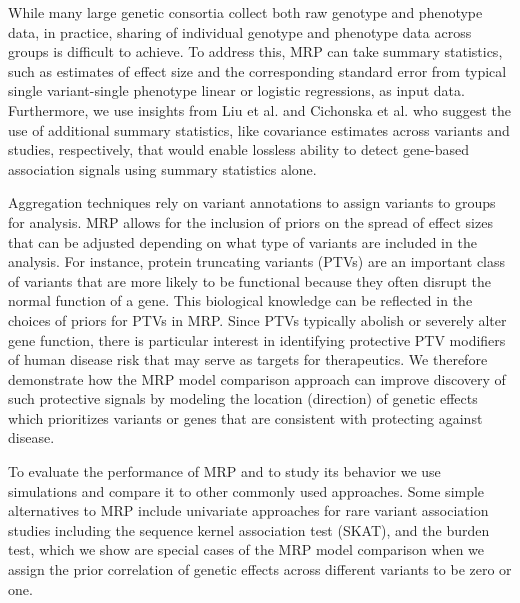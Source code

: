 While many large genetic consortia collect both raw genotype and phenotype data, in practice, sharing of individual genotype and phenotype data across groups is difficult to achieve. To address this, MRP can take summary statistics, such as estimates of effect size and the corresponding standard error from typical single variant-single phenotype linear or logistic regressions, as input data. Furthermore, we use insights from Liu et al.\cite{liu2014meta} and Cichonska et al.\cite{cichonska2016metacca} who suggest the use of additional summary statistics, like covariance estimates across variants and studies, respectively, that would enable lossless ability to detect gene-based association signals using summary statistics alone.  

Aggregation techniques rely on variant annotations to assign variants to groups for analysis. MRP allows for the inclusion of priors on the spread of effect sizes that can be adjusted depending on what type of variants are included in the analysis. For instance, protein truncating variants (PTVs)\cite{rivas2013assessing,rivas2015effect} are an important class of variants that are more likely to be functional because they often disrupt the normal function of a gene. This biological knowledge can be reflected in the choices of priors for PTVs in MRP. Since PTVs typically abolish or severely alter gene function, there is particular interest in identifying protective PTV modifiers of human disease risk that may serve as targets for therapeutics\cite{pcsk9,cohen2006sequence,sullivan2012effect}. We therefore demonstrate how the MRP model comparison approach can improve discovery of such protective signals by modeling the location (direction) of genetic effects which prioritizes variants or genes that are consistent with protecting against disease. 

To evaluate the performance of MRP and to study its behavior we use simulations and compare it to other commonly used approaches. Some simple alternatives to MRP include univariate approaches for rare variant association studies including the sequence kernel association test (SKAT)\cite{skat}, and the burden test, which we show are special cases of the MRP model comparison when we assign the prior correlation of genetic effects across different variants to be zero or one. 
  
